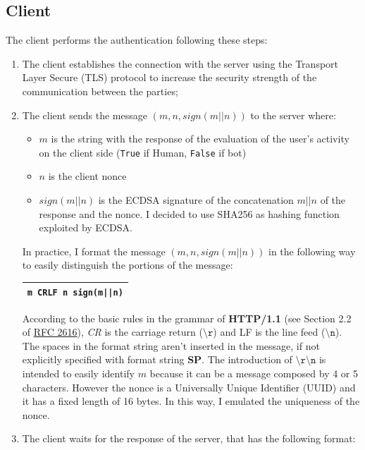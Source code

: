 \subsection{Client}\label{AcCAPPCHA:client}
The client performs the authentication following these steps:
\begin{enumerate}
\item{The client establishes the connection with the server using the Transport Layer Secure (TLS) protocol to increase the security strength of the communication between the parties;}
\item{The client sends the message $(m, n, sign(m||n))$ to the server where:
\begin{itemize}
\item{$m$ is the string with the response of the evaluation of the user's activity on the client side (\texttt{True} if Human, \texttt{False} if bot)}
\item{$n$ is the client nonce}
\item{$sign(m||n)$ is the ECDSA signature of the concatenation $m||n$ of the response and the nonce. I decided to use SHA256 as hashing function exploited by ECDSA.}
\end{itemize}
In practice, I format the message $(m, n, sign(m||n))$ in the following way to easily distinguish the portions of the message:
\begin{table}[H]
\centering\footnotesize
\begin{tabular}{|c|}
\hline
\texttt{m CRLF n sign(m||n)}\\
\hline
\end{tabular}
\end{table}
According to the basic rules in the grammar of \textbf{HTTP/1.1} (see Section 2.2 of \href{https://tools.ietf.org/html/rfc2616}{RFC 2616}), \textit{CR} is the carriage return ($\mathtt{\setminus r}$) and LF is the line feed ($\mathtt{\setminus n}$). The spaces in the format string aren't inserted in the message, if not explicitly specified with format string \textbf{SP}. The introduction of $\mathtt{\setminus r\setminus n}$ is intended to easily identify $m$ because it can be a message composed by 4 or 5 characters. However the nonce is a Universally Unique Identifier (UUID) and it has a fixed length of 16 bytes. In this way, I emulated the uniqueness of the nonce.}
\item{The client waits for the response of the server, that has the following format:
\begin{table}[H]
\centering\footnotesize
\begin{tabular}{|c|}

\end{tabular}
\end{table}}
\end{enumerate}

